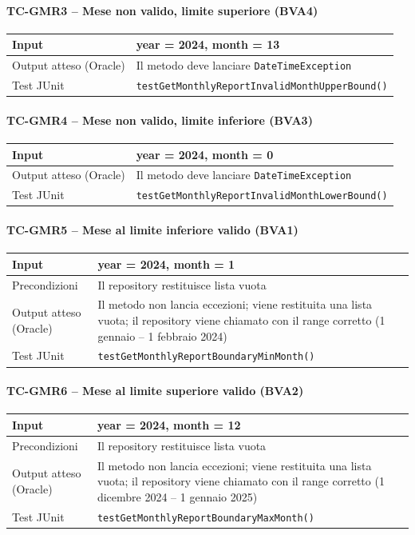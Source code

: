 \documentclass[a4paper,12pt]{article}
\begin{document}
\paragraph{TC-GMR3 -- Mese non valido, limite superiore (BVA4)}
\label{sec:TC-GMR3}
\begin{longtable}{|p{4cm}|p{10.3cm}|}
\hline
Input & year = 2024, month = 13 \\ \hline
Output atteso (Oracle) & Il metodo deve lanciare \texttt{DateTimeException} \\ \hline
Test JUnit & \texttt{testGetMonthlyReportInvalidMonthUpperBound()} \\ \hline
\end{longtable}

\paragraph{TC-GMR4 -- Mese non valido, limite inferiore (BVA3)}
\label{sec:TC-GMR4}
\begin{longtable}{|p{4cm}|p{10.3cm}|}
\hline
Input & year = 2024, month = 0 \\ \hline
Output atteso (Oracle) & Il metodo deve lanciare \texttt{DateTimeException} \\ \hline
Test JUnit & \texttt{testGetMonthlyReportInvalidMonthLowerBound()} \\ \hline
\end{longtable}

\paragraph{TC-GMR5 -- Mese al limite inferiore valido (BVA1)}
\label{sec:TC-GMR5}
\begin{longtable}{|p{4cm}|p{10.3cm}|}
\hline
Input & year = 2024, month = 1 \\ \hline
Precondizioni & Il repository restituisce lista vuota \\ \hline
Output atteso (Oracle) & Il metodo non lancia eccezioni; viene restituita una lista vuota; il repository viene chiamato con il range corretto (1 gennaio -- 1 febbraio 2024) \\ \hline
Test JUnit & \texttt{testGetMonthlyReportBoundaryMinMonth()} \\ \hline
\end{longtable}

\paragraph{TC-GMR6 -- Mese al limite superiore valido (BVA2)}
\label{sec:TC-GMR6}
\begin{longtable}{|p{4cm}|p{10.3cm}|}
\hline
Input & year = 2024, month = 12 \\ \hline
Precondizioni & Il repository restituisce lista vuota \\ \hline
Output atteso (Oracle) & Il metodo non lancia eccezioni; viene restituita una lista vuota; il repository viene chiamato con il range corretto (1 dicembre 2024 -- 1 gennaio 2025) \\ \hline
Test JUnit & \texttt{testGetMonthlyReportBoundaryMaxMonth()} \\ \hline
\end{longtable}
\end{document}
